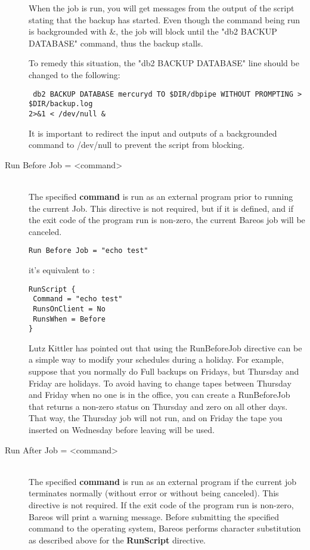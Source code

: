 \begin{description}
When the job is run, you will get messages from the output of the script
stating that the backup has started. Even though the command being run is
backgrounded with \&, the job will block until the "db2 BACKUP DATABASE"
command, thus the backup stalls.

To remedy this situation, the "db2 BACKUP DATABASE" line should be changed to
the following:

\footnotesize
\begin{verbatim}
 db2 BACKUP DATABASE mercuryd TO $DIR/dbpipe WITHOUT PROMPTING > $DIR/backup.log
2>&1 < /dev/null &
\end{verbatim}
\normalsize

It is important to redirect the input and outputs of a backgrounded command to
/dev/null to prevent the script from blocking.

\item [Run Before Job = {\textless}command{\textgreater}] \hfill \\
The specified {\bf command} is run as an external program prior to running the
current Job.  This directive is not required, but if it is defined, and if the
exit code of the program run is non-zero, the current Bareos job will be
canceled.

\begin{verbatim}
Run Before Job = "echo test"
\end{verbatim}
   it's equivalent to :
\begin{verbatim}
RunScript {
 Command = "echo test"
 RunsOnClient = No
 RunsWhen = Before
}
\end{verbatim}

Lutz Kittler has pointed out that using the RunBeforeJob directive can be a
simple way to modify your schedules during a holiday.  For example, suppose
that you normally do Full backups on Fridays, but Thursday and Friday are
holidays.  To avoid having to change tapes between Thursday and Friday when
no one is in the office, you can create a RunBeforeJob that returns a
non-zero status on Thursday and zero on all other days.  That way, the
Thursday job will not run, and on Friday the tape you inserted on Wednesday
before leaving will be used.

\item [Run After Job = {\textless}command{\textgreater}] \hfill \\
The specified {\bf command} is run as an external program if the current
job terminates normally (without error or without being canceled).  This
directive is not required.  If the exit code of the program run is
non-zero, Bareos will print a warning message.  Before submitting the
specified command to the operating system, Bareos performs character
substitution as described above for the {\bf RunScript} directive.


\end{description}
